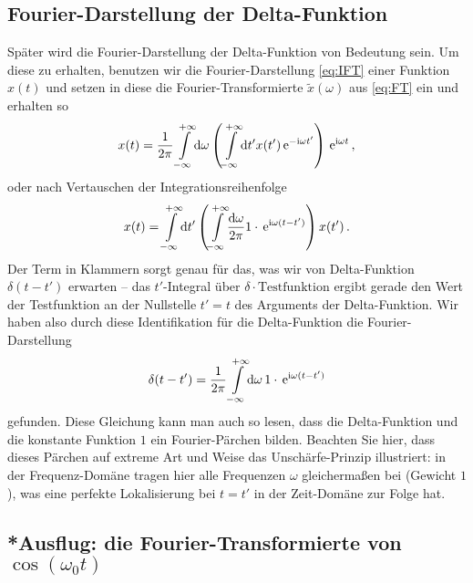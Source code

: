 \documentclass[paper=a4, fontsize=11.0pt, abstractoff, DIV12]{scrartcl}
\begin{document}
\subsection{Fourier-Darstellung der Delta-Funktion}

Später wird die Fourier-Darstellung der Delta-Funktion von Bedeutung sein.
Um diese zu erhalten, benutzen wir die Fourier-Darstellung \eqref{eq:IFT}
einer Funktion $x(t)$ und setzen in diese die Fourier-Transformierte $\tilde
x(\omega)$ aus \eqref{eq:FT} ein und erhalten so
\begin{equation}
x(t) = \frac{1}{2\pi}\int\limits_{-\infty}^{+\infty}\!\mathrm{d}\omega \left( \int\limits_{-\infty}^{+\infty}\!\mathrm{d} t' x(t') \,{\mathrm{e}}^{-\mathrm{i}\omega t'} \right) \,{\mathrm{e}}^{\mathrm{i} \omega t}\,,
\end{equation}
oder nach Vertauschen der Integrationsreihenfolge
\begin{equation}
x(t) = \int\limits_{-\infty}^{+\infty}\!\mathrm{d} t' \left( \int\limits_{-\infty}^{+\infty}\!\frac{\mathrm{d}\omega}{2\pi} 1\cdot\,{\mathrm{e}}^{\mathrm{i} \omega (t-t')} \right)x(t')\,.
\end{equation}
Der Term in Klammern sorgt genau für das, was wir von Delta-Funktion
$\delta(t-t')$ erwarten -- das $t'$-Integral über $\delta \cdot
\mathrm{Testfunktion}$ ergibt gerade den Wert der Testfunktion an der
Nullstelle $t'=t$ des Arguments der Delta-Funktion. Wir haben also durch
diese Identifikation für die Delta-Funktion die Fourier-Darstellung
\begin{equation}
\delta(t-t') = \frac{1}{2\pi} \int\limits_{-\infty}^{+\infty}\!{\mathrm{d}\omega}\, 1\cdot\,{\mathrm{e}}^{\mathrm{i} \omega (t-t')}
\label{eq:DeltaFT}
\end{equation}
gefunden. Diese Gleichung kann man auch so lesen, dass die Delta-Funktion
und die konstante Funktion $1$ ein Fourier-Pärchen bilden. Beachten Sie
hier, dass dieses Pärchen auf extreme Art und Weise das Unschärfe-Prinzip
illustriert: in der Frequenz-Domäne tragen hier alle Frequenzen $\omega$
gleichermaßen bei (Gewicht $1$), was eine perfekte Lokalisierung  bei $t=t'$
in der Zeit-Domäne zur Folge hat.

\subsection{*Ausflug: die Fourier-Transformierte von $\cos(\omega_0 t)$}
\end{document}
